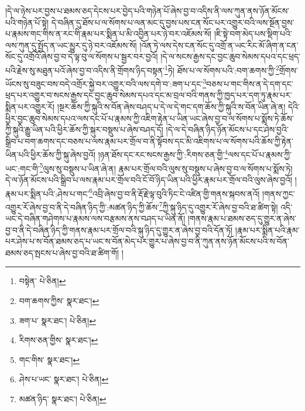 །དེ་ལ་ཉེས་པར་བྱས་པ་ཐམས་ཅད་དེངས་པར་བྱེད་པའི་གཉེན་པོ་ཞེས་བྱ་བ་འདིས་ནི་ལས་ཀུན་ནས་ཉོན་མོངས་པའི་གཉེན་པོ་སྟེ། དེ་བཞིན་དུ་ཐོས་པ་ལ་སོགས་པ་ལན་མང་དུ་བྱས་པས་ངན་སོང་པར་འགྱུར་བའི་ལས་སྔོན་བྱས་པ་རྣམས་གང་གིས་ན་རང་གི་རྣམ་པར་སྨིན་པ་མི་འབྱིན་པར་ཉེ་བར་འཇོམས་སོ། །ཇི་སྟེ་བག་མེད་པས་སྡིག་པའི་ལས་ཀུན་དུ་སྤྱོད་ན་ཡང་མྱུར་དུ་ཉེ་བར་འཇོམས་སོ། །འོན་ཏེ་ལས་དེས་ངན་སོང་དུ་འགྲོ་ན་ཡང་རིང་མོ་ཞིག་ན་ངན་སོང་དུ་འགྲོའོ་ཞེས་བྱ་བ་དེ་ལྟ་བུ་ལ་སོགས་པ་སྦྱར་བར་བྱའོ། །དེ་ལ་སངས་རྒྱས་དང་བྱང་ཆུབ་སེམས་དཔའ་དང་ཕྲད་པའི་རྗེས་སུ་མཐུན་པའོ་ཞེས་བྱ་བ་འདིས་ནི་གྲོགས་ཉིད་བསྟན་\footnote{བསྟེན་  པེ་ཅིན། }ཏེ། ཐོས་པ་ལ་སོགས་པའི་:བག་ཆགས་ཀྱི་\footnote{བག་ཆགས་ཀྱིས་  སྣར་ཐང་། }གྲོགས་ཡོངས་སུ་བཟུང་བས་བདེ་འགྲོར་སྐྱེ་བར་འགྱུར་བའི་ལས་དགེ་བ་:ཟག་པ་དང་\footnote{ཟག་པ་  སྣར་ཐང་།  པེ་ཅིན། }བཅས་པ་གང་གིས་ན་དེ་དག་དང་ཕྲད་པར་འགྱུར་བ་སངས་རྒྱས་དང་བྱང་ཆུབ་སེམས་དཔའ་དང་མ་བྲལ་བའི་གནས་ཀྱི་ཁྱད་པར་དག་ཏུ་རྣམ་པར་སྨིན་པར་འགྱུར་རོ། །སྔར་ཆོས་ཀྱི་སྐུའི་ས་བོན་ཞེས་བཤད་པ་དེ་ལ་དེ་གང་དག་ཆོས་ཀྱི་སྐུའི་ས་བོན་ཡིན་ཞེ་ན། དེའི་ཕྱིར་བྱང་ཆུབ་སེམས་དཔའ་ལས་དང་པོ་པ་རྣམས་ཀྱི་འཇིག་རྟེན་པ་ཡིན་ཡང་ཞེས་བྱ་བ་ལ་སོགས་པ་སྨོས་ཏེ་ཆོས་ཀྱི་སྐུའི་རྒྱུ་ཡིན་པའི་ཕྱིར་ཆོས་ཀྱི་སྐུར་བསྡུས་པ་ཞེས་བཤད་དོ། །དེ་ལ་དེ་བཞིན་ཉིད་ཉོན་མོངས་པ་དང་ཤེས་བྱའི་སྒྲིབ་པ་བག་ཆགས་དང་བཅས་པ་ལས་རྣམ་པར་གྲོལ་བ་ནི་སྟོབས་དང་མི་འཇིགས་པ་ལ་སོགས་པའི་ཆོས་ཀྱི་རྟེན་ཡིན་པའི་ཕྱིར་ཆོས་ཀྱི་སྐུ་ཞེས་བྱའོ། །ཉན་ཐོས་དང་རང་སངས་རྒྱས་ཀྱི་:རིགས་ཅན་གྱི་\footnote{རིགས་ཅན་གྱིས་  སྣར་ཐང་། }ལས་དང་པོ་པ་རྣམས་ཀྱི་ཡང་:གང་གི་\footnote{གང་གིས་  སྣར་ཐང་། }ལུས་སུ་བསྡུས་པ་ཡིན་ཞེ་ན། རྣམ་པར་གྲོལ་བའི་ལུས་སུ་བསྡུས་པ་ཞེས་བྱ་བ་ལ་སོགས་པ་སྨོས་ཏེ། དེ་ལ་ཉོན་མོངས་པའི་སྒྲིབ་པ་ལས་རྣམ་པར་གྲོལ་བའི་ངོ་བོ་ཉིད་ཡིན་པའི་ཕྱིར་རྣམ་པར་གྲོལ་བའི་ལུས་ཞེས་བྱའོ། །རྣམ་པར་སྨིན་པའི་:ཤེས་པ་གང་\footnote{ཤེས་པ་ཡང་  སྣར་ཐང་།  པེ་ཅིན། }འབྲི་ཞེས་བྱ་བ་ནི་རྡོ་རྗེ་ལྟ་བུའི་ཏིང་ངེ་འཛིན་གྱི་གནས་སྐབས་ནའོ། །གནས་ཀྱང་འགྱུར་རོ་ཞེས་བྱ་བ་ནི་དེ་བཞིན་ཉིད་ཀྱི་:མཚན་ཉིད་ཀྱི་ཆོས་\footnote{མཚན་ཉིད་  སྣར་ཐང་།  པེ་ཅིན། }ཀྱི་སྐུ་ཉིད་དུ་འགྱུར་རོ་ཞེས་བྱ་བའི་ཐ་ཚིག་སྟེ། འདི་ཡང་དེ་བཞིན་གཤེགས་པ་རྣམས་ལས་བརྩམས་ནས་བཤད་པ་ཡིན་ནོ། །གནས་རྣམ་པ་ཐམས་ཅད་དུ་གྱུར་ན་ཞེས་བྱ་བ་ནི་དེ་བཞིན་ཉིད་ཀྱི་གནས་རྣམ་པར་གྲོལ་བའི་སྐུ་ཉིད་དུ་གྱུར་ན་ཞེས་བྱ་བའི་དོན་ཏོ། །རྣམ་པར་སྨིན་པའི་རྣམ་པར་ཤེས་པ་ས་བོན་ཐམས་ཅད་པ་ཡང་ས་བོན་མེད་པར་གྱུར་པ་ཞེས་བྱ་བ་ནི་ཀུན་ནས་ཉོན་མོངས་པའི་ས་བོན་ཐམས་ཅད་སྤངས་པ་ཞེས་བྱ་བའི་ཐ་ཚིག་གོ། །
